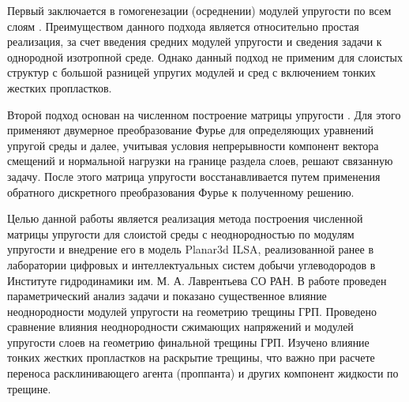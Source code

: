 Первый заключается в гомогенезации (осреднении) модулей упругости по всем слоям \cite{DONTSOV2021108144}. Преимуществом данного подхода является относительно простая реализация, за счет введения средних модулей упругости и сведения задачи к однородной изотропной среде. Однако данный подход не применим для слоистых структур с большой разницей упругих модулей и сред с включением тонких жестких пропластков.

Второй подход основан на численном построение матрицы упругости \cite{Siebrits_Peirce_2002,Peirce2001TheSF,Peirce2001UniformAA,Linkov1992}. Для этого применяют двумерное преобразование Фурье для определяющих уравнений упругой среды и далее, учитывая условия непрерывности компонент вектора смещений и нормальной нагрузки на границе раздела слоев, решают связанную задачу. После этого матрица упругости восстанавливается путем применения обратного дискретного преобразования Фурье к полученному решению.

Целью данной работы является реализация метода построения численной матрицы упругости для слоистой среды с неоднородностью по модулям упругости и внедрение его в модель Planar3d ILSA, реализованной ранее в лаборатории цифровых и интеллектуальных систем добычи углеводородов в Институте гидродинамики им. М. А. Лаврентьева СО РАН. В работе проведен параметрический анализ задачи и показано существенное влияние неоднородности модулей упругости на геометрию трещины ГРП. Проведено сравнение влияния неоднородности сжимающих напряжений и модулей упругости слоев на геометрию финальной трещины ГРП. Изучено влияние тонких жестких пропластков на раскрытие трещины, что важно при расчете переноса расклинивающего агента (проппанта) и других компонент жидкости по трещине.


\clearpage